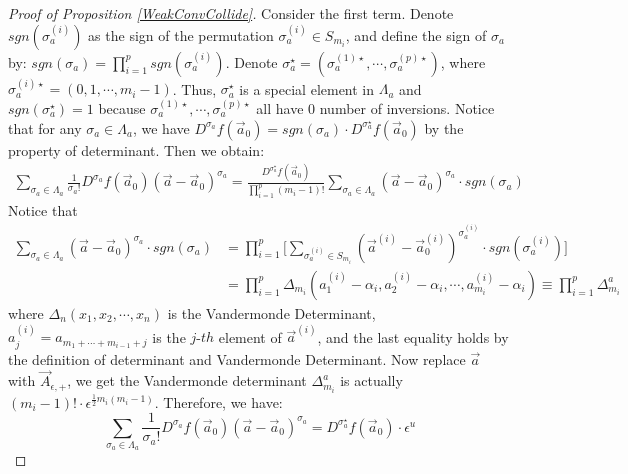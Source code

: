 \begin{proof}[Proof of Proposition \ref{WeakConvCollide}]
Consider the first term. Denote $sgn(\sigma_{a}^{(i)})$ as the sign of the permutation $\sigma_{a}^{(i)}\in S_{m_i}$, and define the sign of $\sigma_{a}$ by: $sgn(\sigma_{a})=\prod_{i=1}^{p}sgn(\sigma_{a}^{(i)})$. Denote $\sigma_{a}^{\star}=(\sigma_{a}^{(1)\star},\cdots,\sigma_{a}^{(p)\star})$, where $\sigma_{a}^{(i)\star}=(0,1,\cdots,m_i-1)$. Thus, $\sigma_{a}^{\star}$ is a special element in $\Lambda_{a}$ and $sgn(\sigma_{a}^{\star})=1$ because $\sigma_{a}^{(1)\star},\cdots,\sigma_{a}^{(p)\star}$ all have $0$ number of inversions. Notice that for any $\sigma_{a}\in\Lambda_{a}$, we have $D^{\sigma_{a}}f(\vec{a}_{0})=sgn(\sigma_{a})\cdot D^{\sigma_{a}^{\star}}f(\vec{a}_{0})$ by the property of determinant. Then we obtain:
\begin{align*}
	\sum_{\sigma_{a}\in\Lambda_{a}}\frac{1}{\sigma_{a}!}D^{\sigma_{a}}f(\vec{a}_{0})(\vec{a}-\vec{a}_{0})^{\sigma_{a}}=\frac{D^{\sigma_{a}^{\star}}f(\vec{a}_{0})}{\prod_{i=1}^{p}(m_{i}-1)!}\sum_{\sigma_{a}\in\Lambda_{a}}(\vec{a}-\vec{a}_{0})^{\sigma_{a}}\cdot sgn(\sigma_{a})
\end{align*}
Notice that 
\begin{align*}
	\sum_{\sigma_{a}\in\Lambda_{a}}(\vec{a}-\vec{a}_{0})^{\sigma_{a}}\cdot sgn(\sigma_{a})&=\prod_{i=1}^{p}\Big[\sum_{\sigma_{a}^{(i)}\in S_{m_i}}(\vec{a}^{(i)}-\vec{a}_{0}^{(i)})^{\sigma_{a}^{(i)}}\cdot sgn(\sigma_{a}^{(i)})\Big]\\
	&=\prod_{i=1}^{p}\Delta_{m_i}(a_{1}^{(i)}-\alpha_{i},a_{2}^{(i)}-\alpha_{i},\cdots,a_{m_i}^{(i)}-\alpha_{i})\equiv\prod_{i=1}^{p}\Delta_{m_i}^{a}
\end{align*}
where $\Delta_{n}(x_{1},x_{2},\cdots,x_{n})$ is the Vandermonde Determinant, $a_{j}^{(i)}=a_{m_{1}+\cdots+m_{i-1}+j}$ is the $j$-$th$ element of $\vec{a}^{(i)}$, and the last equality holds by the definition of determinant and Vandermonde Determinant. Now replace $\vec{a}$ with $\vec{A}_{\epsilon,+}$, we get the Vandermonde determinant $\Delta_{m_{i}}^{a}$ is actually $(m_{i}-1)!\cdot\epsilon^{\frac{1}{2}m_{i}(m_{i}-1)}$. Therefore, we have: $$\sum_{\sigma_{a}\in\Lambda_{a}}\frac{1}{\sigma_{a}!}D^{\sigma_{a}}f(\vec{a}_{0})(\vec{a}-\vec{a}_{0})^{\sigma_{a}}=D^{\sigma_{a}^{\star}}f(\vec{a}_{0})\cdot\epsilon^{u}$$


\end{proof}

